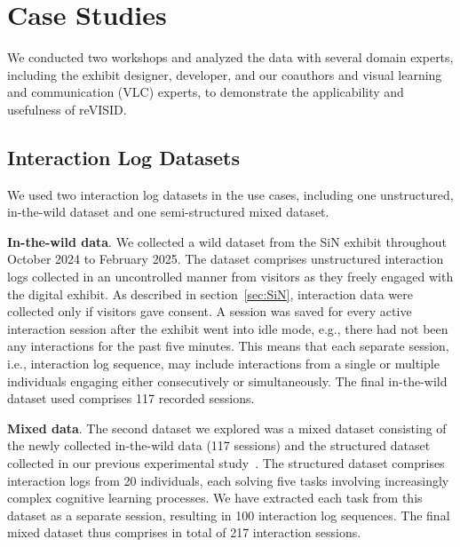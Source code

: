 \documentclass[preprint,journal]{vgtc}            %
\begin{document}

\section{Case Studies}

We conducted two workshops and analyzed the data with several domain experts, including the exhibit designer, developer, and our coauthors and visual learning and communication (VLC) experts, to demonstrate the applicability and usefulness of reVISID.


\subsection{Interaction Log Datasets}
\label{subsec:datasets}

We used two interaction log datasets in the use cases, including one unstructured, in-the-wild dataset and one semi-structured mixed dataset.

\noindent
\textbf{In-the-wild data}. 
We collected a wild dataset from the SiN exhibit throughout October 2024 to February 2025. 
The dataset comprises unstructured interaction logs collected in an uncontrolled manner from visitors as they freely engaged with the digital exhibit. 
As described in section~\ref{sec:SiN}, interaction data were collected only if visitors gave consent. 
A session was saved for every active interaction session after the exhibit went into idle mode, e.g., there had not been any interactions for the past five minutes.
This means that each separate session, i.e., interaction log sequence, may include interactions from a single or multiple individuals engaging either consecutively or simultaneously.
The final in-the-wild dataset used comprises 117 recorded sessions.

\noindent 
\textbf{Mixed data}.
The second dataset we explored was a mixed dataset consisting of the newly collected in-the-wild data (117 sessions) and the structured dataset collected in our previous experimental study~\cite{Yu25Revealing}. 
The structured dataset comprises interaction logs from 20 individuals, each solving five tasks involving increasingly complex cognitive learning processes. 
We have extracted each task from this dataset as a separate session, resulting in 100 interaction log sequences.
The final mixed dataset thus comprises in total of 217 interaction sessions. 
\end{document}
